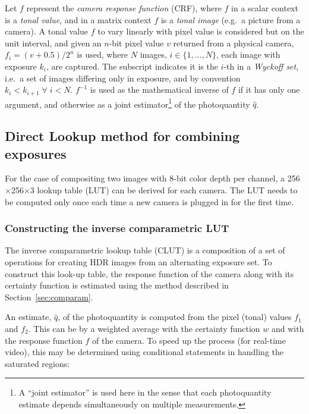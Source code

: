 Let $f$ represent the \textit{camera response
  function} (CRF), where $f$ in a scalar context is a \textit{tonal
  value}, and in a matrix context $f$ is a \textit{tonal image} (e.g.\
a picture from a camera).  A tonal value $f$ to vary
linearly with pixel value is considered but on the unit interval, and given an
$n$-bit pixel value $v$ returned from a physical camera, $f_i =
(v+0.5)/2^n$ is used, where $N$ images, $i\in\{1,\ldots,N\}$, each
image with exposure $k_i$, are captured. The subscript indicates it is the $i$-th in
a \textit{Wyckoff set}\cite{comparam}, i.e.\ a set of images differing
only in exposure, and by convention $k_{i}<k_{i+1} \;\forall\; i<N$.
$f^{-1}$ is used as the mathematical inverse of $f$ if it has only one
argument, and otherwise as a joint estimator\footnote{A ``joint
  estimator'' is used here in the sense that each photoquantity
  estimate depends simultaneously on multiple measurements.} of the
photoquantity $\hat{q}$.

 
\subsection{Direct Lookup method for combining
  exposures} \label{comp_2_lut}
 
For the case of compositing two images with 8-bit color depth per
channel, a 256$\times$256$\times$3 lookup table (LUT) can be derived for each camera.
The LUT needs to be computed only once each time a new camera is plugged
in for the first time.

 
\subsubsection{Constructing the inverse comparametric LUT}

The inverse comparametric lookup table (CLUT) is a composition of a set
of operations for creating HDR images from an alternating exposure
set.  To construct this look-up table, the response
function of the camera along with its certainty function is estimated using the
method described in Section~\ref{sec:comparam}.

An estimate, $\hat{q}$, of the photoquantity is computed from the
pixel (tonal) values $f_1$ and $f_2$.  This can be by a weighted average
with the certainty function $w$ and with the response function $f$ of
the camera.  To speed up the process (for real-time video), this may be
determined using conditional statements in handling the saturated regions:

